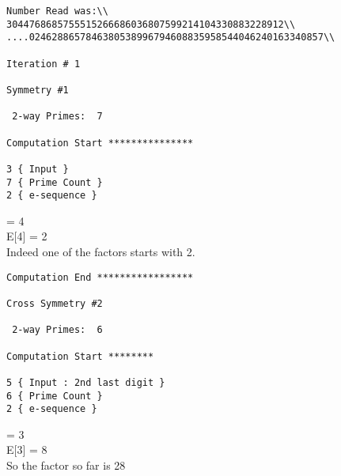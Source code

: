 \begin{verbatim}
Number Read was:\\
3044768685755515266686036807599214104330883228912\\
....0246288657846380538996794608835958544046240163340857\\

Iteration #	1

Symmetry #1

 2-way Primes: 	7

Computation Start ***************

3 { Input }
7 { Prime Count }
2 { e-sequence }

\end {verbatim}
\Pi[273] = 4 \\
E[4] = 2 \\
Indeed one of the factors starts with 2. \\
\begin {verbatim}
Computation End *****************

Cross Symmetry #2

 2-way Primes: 	6

Computation Start ********

5 { Input : 2nd last digit }
6 { Prime Count }
2 { e-sequence } 

\end{verbatim}
\Pi[265] = 3 \\
E[3] = 8 \\
So the factor so far is { 28 }
